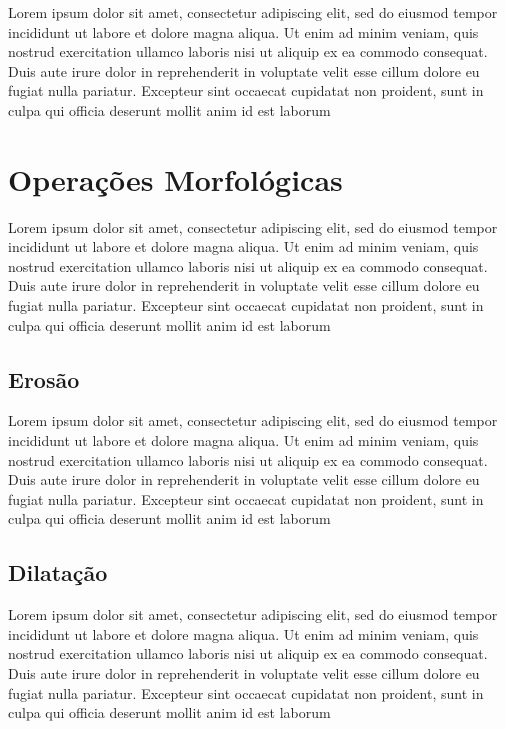 Lorem ipsum dolor sit amet, consectetur adipiscing elit, sed do eiusmod tempor incididunt ut labore et dolore magna aliqua. Ut enim ad minim veniam, quis nostrud exercitation ullamco laboris nisi ut aliquip ex ea commodo consequat. Duis aute irure dolor in reprehenderit in voluptate velit esse cillum dolore eu fugiat nulla pariatur. Excepteur sint occaecat cupidatat non proident, sunt in culpa qui officia deserunt mollit anim id est laborum

\section{Operações Morfológicas}
\label{sec:morfologicas}

Lorem ipsum dolor sit amet, consectetur adipiscing elit, sed do eiusmod tempor incididunt ut labore et dolore magna aliqua. Ut enim ad minim veniam, quis nostrud exercitation ullamco laboris nisi ut aliquip ex ea commodo consequat. Duis aute irure dolor in reprehenderit in voluptate velit esse cillum dolore eu fugiat nulla pariatur. Excepteur sint occaecat cupidatat non proident, sunt in culpa qui officia deserunt mollit anim id est laborum

\subsection{Erosão}
\label{sec:erosao}

Lorem ipsum dolor sit amet, consectetur adipiscing elit, sed do eiusmod tempor incididunt ut labore et dolore magna aliqua. Ut enim ad minim veniam, quis nostrud exercitation ullamco laboris nisi ut aliquip ex ea commodo consequat. Duis aute irure dolor in reprehenderit in voluptate velit esse cillum dolore eu fugiat nulla pariatur. Excepteur sint occaecat cupidatat non proident, sunt in culpa qui officia deserunt mollit anim id est laborum

\subsection{Dilatação}
\label{sec:dilatacao}

Lorem ipsum dolor sit amet, consectetur adipiscing elit, sed do eiusmod tempor incididunt ut labore et dolore magna aliqua. Ut enim ad minim veniam, quis nostrud exercitation ullamco laboris nisi ut aliquip ex ea commodo consequat. Duis aute irure dolor in reprehenderit in voluptate velit esse cillum dolore eu fugiat nulla pariatur. Excepteur sint occaecat cupidatat non proident, sunt in culpa qui officia deserunt mollit anim id est laborum

